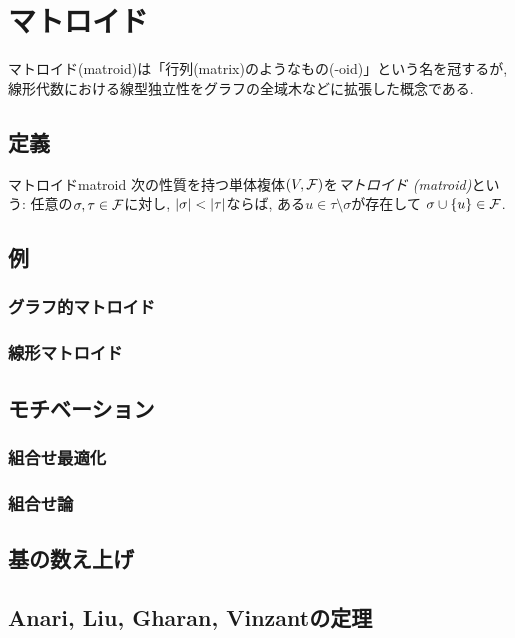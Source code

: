 \chapter{マトロイド}
マトロイド(matroid)は「行列(matrix)のようなもの(-oid)」という名を冠するが,
線形代数における線型独立性をグラフの全域木などに拡張した概念である.

\section{定義}
\begin{definition}{マトロイド}{matroid}
    次の性質を持つ単体複体$(V,\mathcal{F})$を\emph{マトロイド (matroid)}という:
    任意の$\sigma,\tau \in \mathcal{F}$に対し, $\lvert\sigma\rvert < \lvert\tau\rvert$ならば,
    ある$ u \in \tau \setminus \sigma$が存在して
    $\sigma \cup \lbrace u\rbrace \in \mathcal{F}$.
\end{definition}

\section{例}
\subsection{グラフ的マトロイド}
\subsection{線形マトロイド}
\section{モチベーション}
\subsection{組合せ最適化}
\subsection{組合せ論}
\section{基の数え上げ}
\section{Anari, Liu, Gharan, Vinzantの定理}
